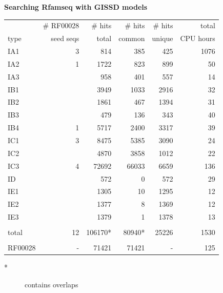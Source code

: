 \documentclass[landscape]{slides}
\begin{document}
\begin{slide}
\begin{center}
\small
\textbf{Searching Rfamseq with GISSD models}
\end{center}

\small
\begin{center}
\begin{tabular}{l|r|rrr|r}
\tt
        & \# RF00028 & \# hits   & \# hits& \# hits& total     \\
type    & seed seqs  & total     & common & unique & CPU hours \\ \hline
IA1     & 3          &  814      & 385    & 425    & 1076 \\
IA2     & 1          &  1722     & 823    & 899    & 50 \\
IA3     &            &   958     & 401    & 557    & 14 \\
IB1     &            &  3949     & 1033   & 2916   & 32 \\
IB2     &            & 1861     & 467    & 1394   & 31 \\
IB3     &            & 479     & 136    & 343    & 40 \\
IB4     &  1         & 5717     & 2400   & 3317   & 39 \\
IC1     &  3         & 8475     & 5385   & 3090   & 24 \\
IC2     &            & 4870     & 3858   & 1012   & 22 \\
IC3     & 4          & 72692     & 66033  & 6659   & 136 \\
ID      &            & 572     & 0      & 572    & 29 \\
IE1     &            & 1305     & 10     & 1295   & 12 \\
IE2     &            & 1377     & 8      & 1369   & 12 \\
IE3     &            & 1379     & 1      & 1378   & 13 \\
        &            &          &        &        &    \\
total   & 12         & 106170*   & 80940* & 25226  & 1530 \\
        &           &           &        &    \\
RF00028 & -         & 71421     & 71421  & -      & 125 \\
\end{tabular}

\begin{description}
\item[*] contains overlaps
\end{description}

\end{center}

\vfill
\end{slide}
\end{document}
